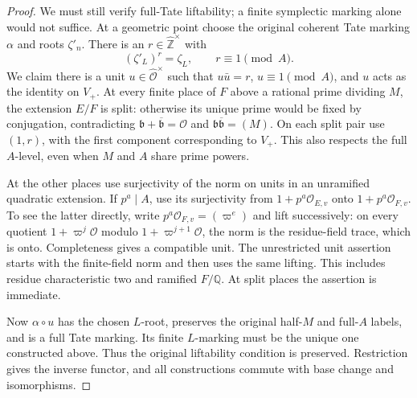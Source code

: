 \begin{proof}
We must still verify full-Tate liftability; a finite symplectic
marking alone would not suffice.  At a geometric point choose the
original coherent Tate marking $\alpha$ and roots $\zeta'_n$.
There is an $r\in\widehat{\mathbb Z}^{\times}$ with
\[
  (\zeta'_L)^r=\zeta_L,\qquad r\equiv1\pmod A.
\]
We claim there is a unit $u\in\widehat{\mathcal O}^{\times}$ such
that $u\bar u=r$, $u\equiv1\pmod A$, and $u$ acts as the identity
on $V_+$.  At every finite place of $F$ above a rational prime
dividing $M$, the extension $E/F$ is split: otherwise its unique
prime would be fixed by conjugation, contradicting
$\mathfrak b+\overline{\mathfrak b}=\mathcal O$ and
$\mathfrak b\overline{\mathfrak b}=(M)$.
On each split pair use $(1,r)$, with the first component corresponding
to $V_+$.  This also respects the full $A$-level, even when $M$ and
$A$ share prime powers.

At the other places use surjectivity of the norm on units in an
unramified quadratic extension.  If $p^a\mid A$, use its
surjectivity from $1+p^a\mathcal O_{E,v}$ onto
$1+p^a\mathcal O_{F,v}$.  To see the latter directly, write
$p^a\mathcal O_{F,v}=(\varpi^e)$ and lift successively: on every
quotient $1+\varpi^j\mathcal O$ modulo
$1+\varpi^{j+1}\mathcal O$, the norm is the residue-field trace,
which is onto.  Completeness gives a compatible unit.  The unrestricted
unit assertion starts with the finite-field norm and then uses the
same lifting.  This includes residue characteristic two and ramified
$F/\mathbb Q$.  At split places the assertion is immediate.

Now $\alpha\circ u$ has the chosen $L$-root, preserves the original
half-$M$ and full-$A$ labels, and is a full Tate marking.  Its finite
$L$-marking must be the unique one constructed above.  Thus the
original liftability condition is preserved.  Restriction gives the
inverse functor, and all constructions commute with base change and
isomorphisms.
\end{proof}

